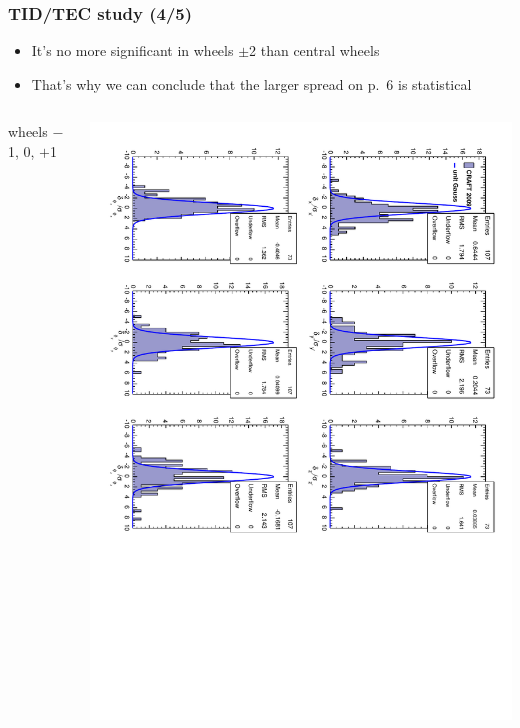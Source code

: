 \documentclass[compress]{beamer}
\begin{document}
\begin{frame}
\frametitle{TID/TEC study (4/5)}
\begin{itemize}
\item It's no more significant in wheels $\pm$2 than central wheels
\item That's why we can conclude that the larger spread on p.~6 is statistical
\end{itemize}

\begin{columns}
\begin{center}
wheels $-$1, 0, $+$1
\end{center}
\includegraphics[height=\linewidth, angle=90]{tecnorm_central.pdf}


\end{columns}
\end{frame}
\end{document}
